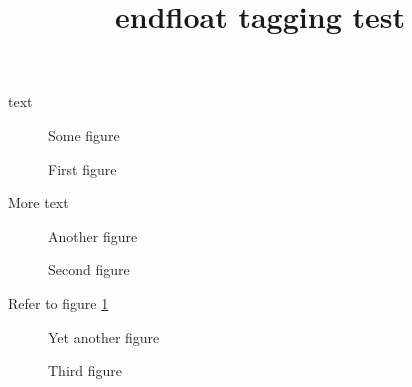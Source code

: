 \documentclass{article}
\title{endfloat tagging test}
\begin{document}
text
\begin{figure}
Some figure
\caption{First figure}
\end{figure}
More text
\begin{figure}
Another figure
\caption{Second figure}
\label{fig}
\end{figure}
Refer to figure \ref{fig}
\begin{figure}
Yet another figure
\caption{Third figure}
\end{figure}
\end{document}
